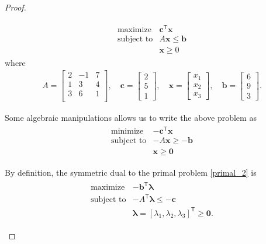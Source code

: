 \documentclass[12pt]{article}
\theoremstyle{definition}
\newcommand{\vc}[1]{\boldsymbol{#1}}
\newcommand{\tran}{\mathsf{T}}
\begin{document}
\begin{proof}
\begin{enumerate}
      \begin{align*}
        \begin{array}{rl}
          \text{maximize} & \vc{c}^\tran \vc{x} \\
          \text{subject to} & A\vc{x} \leq \vc{b} \\
          & \vc{x} \geq 0
        \end{array}
      \end{align*}
      where
      \begin{align*}
        A = \begin{bmatrix}2 & -1 & 7 \\ 1 & 3 & 4 \\ 3 & 6 & 1 \\\end{bmatrix}, \quad \vc{c} = \begin{bmatrix}2 \\ 5 \\ 1\end{bmatrix}, \quad
        \vc{x} = \begin{bmatrix}x_1 \\ x_2 \\ x_3\end{bmatrix}, \quad \vc{b} = \begin{bmatrix}6 \\ 9 \\ 3\end{bmatrix}.
      \end{align*}

      Some algebraic manipulations allows us to write the above problem as
      \begin{align}\label{primal_2}
        \begin{array}{rl}
          \text{minimize} & -\vc{c}^\tran \vc{x} \\
          \text{subject to} & -A\vc{x} \geq -\vc{b} \\
          & \vc{x} \geq \vc{0}
        \end{array}
      \end{align}

      By definition, the symmetric dual to the primal problem \eqref{primal_2} is
      \begin{align*}
        \begin{array}{rl}
          \text{maximize} & -\vc{b}^\tran \vc{\lambda} \\
          \text{subject to} & -A^\tran\vc{\lambda} \leq -\vc{c} \\
          & \vc{\lambda} = [\lambda_1, \lambda_2, \lambda_3]^\tran \geq \vc{0}.
        \end{array}
      \end{align*}


\end{enumerate}
\end{proof}
\end{document}
